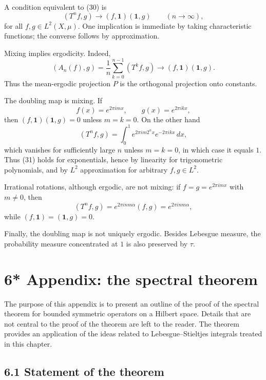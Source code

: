 \documentclass[11pt,openany]{book}
\begin{document}
A condition equivalent to (30) is
\begin{equation}
(T^nf,g)\longrightarrow(f,\mathbf1)(\mathbf1,g)
\qquad(n\to\infty),
\tag{31}
\end{equation}
for all $f,g\in L^2(X,\mu)$. One implication is immediate by taking characteristic functions; the converse follows by approximation.

Mixing implies ergodicity. Indeed,
\[
(A_n(f),g)=\frac1n\sum_{k=0}^{n-1}(T^kf,g)
\longrightarrow(f,\mathbf1)(\mathbf1,g).
\]
Thus the mean-ergodic projection $P$ is the orthogonal projection onto constants.

The doubling map is mixing. If
\[
f(x)=e^{2\pi imx},
\qquad
g(x)=e^{2\pi ikx},
\]
then $(f,\mathbf1)(\mathbf1,g)=0$ unless $m=k=0$. On the other hand
\[
(T^nf,g)=\int_0^1e^{2\pi im2^nx}e^{-2\pi ikx}\,dx,
\]
which vanishes for sufficiently large $n$ unless $m=k=0$, in which case it equals $1$. Thus (31) holds for exponentials, hence by linearity for trigonometric polynomials, and by $L^2$ approximation for arbitrary $f,g\in L^2$.

Irrational rotations, although ergodic, are not mixing: if $f=g=e^{2\pi imx}$ with $m\neq0$, then
\[
(T^nf,g)=e^{2\pi inm\alpha}(f,g)=e^{2\pi inm\alpha},
\]
while $(f,\mathbf1)=(\mathbf1,g)=0$.

Finally, the doubling map is not uniquely ergodic. Besides Lebesgue measure, the probability measure concentrated at $1$ is also preserved by $\tau$.

\setcounter{section}{6}
\setcounter{theorem}{0}
\section*{6* Appendix: the spectral theorem}

The purpose of this appendix is to present an outline of the proof of the spectral theorem for bounded symmetric operators on a Hilbert space. Details that are not central to the proof of the theorem are left to the reader. The theorem provides an application of the ideas related to Lebesgue--Stieltjes integrals treated in this chapter.

\subsection*{6.1 Statement of the theorem}
\end{document}

